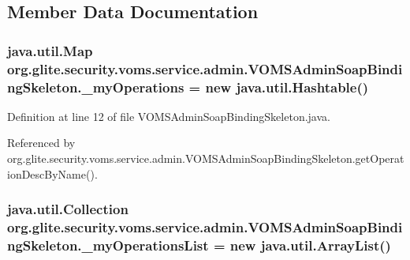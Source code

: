 \subsection{Member Data Documentation}
\hypertarget{classorg_1_1glite_1_1security_1_1voms_1_1service_1_1admin_1_1VOMSAdminSoapBindingSkeleton_a51144e94c857cbc57455ca522d42d1cc}{
\subsubsection[{\_\-myOperations}]{\setlength{\rightskip}{0pt plus 5cm}java.util.Map {\bf org.glite.security.voms.service.admin.VOMSAdminSoapBindingSkeleton.\_\-myOperations} = new java.util.Hashtable()}}
\label{classorg_1_1glite_1_1security_1_1voms_1_1service_1_1admin_1_1VOMSAdminSoapBindingSkeleton_a51144e94c857cbc57455ca522d42d1cc}


Definition at line 12 of file VOMSAdminSoapBindingSkeleton.java.



Referenced by org.glite.security.voms.service.admin.VOMSAdminSoapBindingSkeleton.getOperationDescByName().

\hypertarget{classorg_1_1glite_1_1security_1_1voms_1_1service_1_1admin_1_1VOMSAdminSoapBindingSkeleton_a46b030ddb43b9300369fb410bd8db0ea}{
\subsubsection[{\_\-myOperationsList}]{\setlength{\rightskip}{0pt plus 5cm}java.util.Collection {\bf org.glite.security.voms.service.admin.VOMSAdminSoapBindingSkeleton.\_\-myOperationsList} = new java.util.ArrayList()}}
\label{classorg_1_1glite_1_1security_1_1voms_1_1service_1_1admin_1_1VOMSAdminSoapBindingSkeleton_a46b030ddb43b9300369fb410bd8db0ea}


